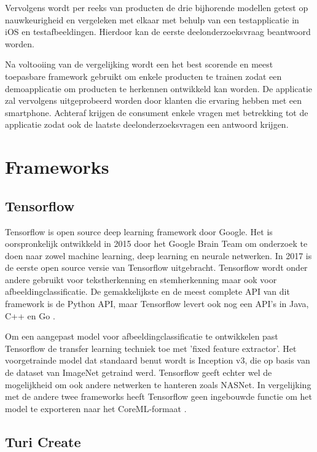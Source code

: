 Vervolgens wordt per reeks van producten de drie bijhorende modellen getest op nauwkeurigheid en vergeleken met elkaar met behulp van een testapplicatie in iOS en testafbeeldingen. Hierdoor kan de eerste deelonderzoeksvraag beantwoord worden.

Na voltooiing van de vergelijking wordt een het best scorende en meest toepasbare framework gebruikt om enkele producten te trainen zodat een demoapplicatie om producten te herkennen ontwikkeld kan worden. De applicatie zal vervolgens uitgeprobeerd worden door klanten die ervaring hebben met een smartphone. Achteraf krijgen de consument enkele vragen met betrekking tot de applicatie zodat ook de laatste deelonderzoeksvragen een antwoord krijgen. 
\section{Frameworks}
\label{sec:Frameworks}

\subsection{Tensorflow}
\label{ssec:Tensorflow}

Tensorflow is open source deep learning framework door Google. Het is oorspronkelijk ontwikkeld in 2015 door het Google Brain Team om onderzoek te doen naar zowel machine learning, deep learning en neurale netwerken. In 2017 is de eerste open source versie van Tensorflow uitgebracht. Tensorflow wordt onder andere gebruikt voor tekstherkenning en stemherkenning maar ook voor afbeeldingclassificatie. De gemakkelijkste en de meest complete \acrshort{API} van dit framework is de Python \acrshort{API}, maar Tensorflow levert ook nog een API’s in Java, C++ en Go \autocite{introTensorflow}.

Om een aangepast model voor afbeeldingclassificatie te ontwikkelen past Tensorflow de transfer learning techniek toe met 'fixed feature extractor'. Het voorgetrainde model dat standaard benut wordt is Inception v3, die op basis van de dataset van ImageNet getraind werd. Tensorflow geeft echter wel de mogelijkheid om ook andere netwerken te hanteren zoals NASNet. In vergelijking met de andere twee frameworks heeft Tensorflow geen ingebouwde functie om het model te exporteren naar het CoreML-formaat \autocite{deeplearningTensor}.

\subsection{Turi Create}
\label{ssec:Turi Create}

